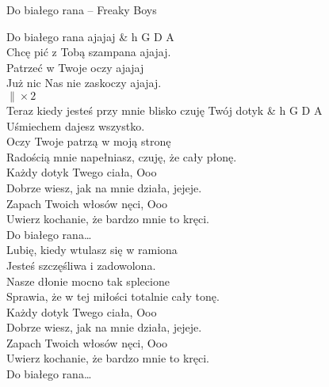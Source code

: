 \begin{piosenka}{Do białego rana -- Freaky Boys}

 Do białego rana ajajaj & h G D A \\
 Chcę pić z Tobą szampana ajajaj. \\
 Patrzeć w Twoje oczy ajajaj \\
 Już nic Nas nie zaskoczy ajajaj. \\
 $\| \times 2$ \\[\zwrotkaspace]

Teraz kiedy jesteś przy mnie blisko czuję Twój dotyk & h G D A \\
Uśmiechem dajesz wszystko. \\
Oczy Twoje patrzą w moją stronę \\
Radością mnie napełniasz, czuję, że cały płonę. \\

Każdy dotyk Twego ciała, Ooo \\
Dobrze wiesz, jak na mnie działa, jejeje. \\
Zapach Twoich włosów nęci, Ooo \\
Uwierz kochanie, że bardzo mnie to kręci. \\[\zwrotkaspace]

 Do białego rana\ldots \\[\zwrotkaspace]

Lubię, kiedy wtulasz się w ramiona \\
Jesteś szczęśliwa i zadowolona. \\
Nasze dłonie mocno tak splecione \\
Sprawia, że w tej miłości totalnie cały tonę. \\

Każdy dotyk Twego ciała, Ooo \\
Dobrze wiesz, jak na mnie działa, jejeje. \\
Zapach Twoich włosów nęci, Ooo \\
Uwierz kochanie, że bardzo mnie to kręci. \\[\zwrotkaspace]

 Do białego rana\ldots \\[\zwrotkaspace]

\end{piosenka}